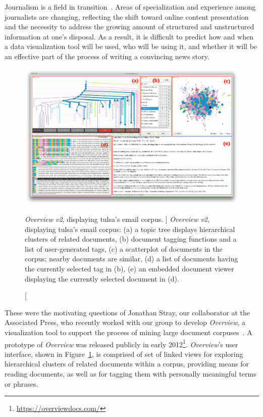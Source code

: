 Journalism is a field in transition~\cite{Howard2012}. 
Areas of specialization and experience among journalists are changing, reflecting the shift toward online content presentation and the necessity to address the growing amount of structured and unstructured information at one's disposal. 
As a result, it is difficult to predict how and when a data visualization tool will be used, who will be using it, and whether it will be an effective part of the process of writing a convincing news story. 


\begin{figure}
    \centering
    \includegraphics[width=\textwidth]{figures/overview_jw.png}
    \caption
    [
        {\it Overview v2}, displaying {\sc tulsa}'s email corpus.
    ]
    {
        {\it Overview v2}, displaying {\sc tulsa}'s email corpus: (a) a topic tree displays hierarchical clusters of related documents, (b) document tagging functions and a list of user-generated tags, (c) a scatterplot of documents in the corpus; nearby documents are similar, (d) a list of documents having the currently selected tag in (b), (e) an embedded document viewer displaying the currently selected document in (d).
    }
    \label{fig:overview:tulsa}
    \centering
\end{figure}


These were the motivating questions of Jonathan Stray, our collaborator at the Associated Press, who recently worked with our group to develop {\it Overview}, a visualization tool to support the process of mining large document corpuses~\cite{Ingram2012}. 
A prototype of {\it Overview} was released publicly in early 2012\footnote{\url{https://overviewdocs.com/}}. 
{\it Overview}'s user interface, shown in Figure~\ref{fig:overview:tulsa}, is comprised of set of linked views for exploring hierarchical clusters of related documents within a corpus, providing means for reading documents, as well as for tagging them with personally meaningful terms or phrases. 

